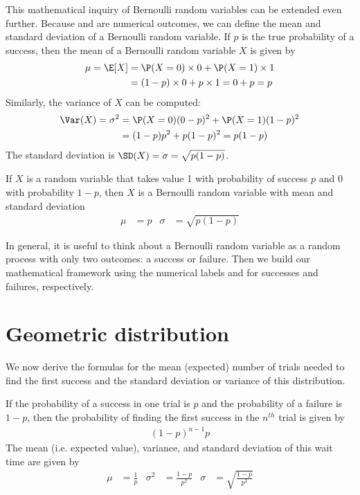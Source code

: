 This mathematical inquiry of Bernoulli random variables can be extended even further. Because  and  are numerical outcomes, we can define the {mean} and {standard deviation} of a Bernoulli random variable. If ${p}$ is the true probability of a success, then the mean of a Bernoulli random variable $X$ is given by
\begin{align*}
\mu = \E[X] &= \P(X=0)\times0 + \P(X=1)\times1 \\
	&= (1-p)\times0 + p\times 1 = 0+p = p
\end{align*}
Similarly, the variance of $X$ can be computed:
\begin{align*}
\Var(X)=\sigma^2 &= {\P(X=0)(0-p)^2 + \P(X=1)(1-p)^2} \\
	&= {(1-p)p^2 + p(1-p)^2} = {p(1-p)}
\end{align*}
The standard deviation is $\SD(X)=\sigma=\sqrt{p(1-p)}$.

\begin{termBox}{
If $X$ is a random variable that takes value 1 with probability of success $p$ and 0 with probability $1-p$, then $X$ is a Bernoulli random variable with mean and standard deviation
\begin{align*}
\mu &= p
	&\sigma&= \sqrt{p(1-p)}
\end{align*}}
\end{termBox}

In general, it is useful to think about a Bernoulli random variable as a random process with only two outcomes: a success or failure. Then we build our mathematical framework using the numerical labels  and  for successes and failures, respectively.


\section{Geometric distribution}\label{geomDist}



We now derive the formulas for the mean (expected) number of trials needed to find the first success and the standard deviation or variance of this distribution.

\begin{termBox}{
If the probability of a success in one trial is $p$ and the probability of a failure is $1-p$, then the probability of finding the first success in the $n^{th}$ trial is given by\vspace{-1.5mm}
\begin{eqnarray}
(1-p)^{n-1}p
\end{eqnarray}
The mean (i.e. expected value), variance, and standard deviation of this wait time are given by\vspace{-2.5mm}
\begin{align}
\mu &= \frac{1}{p}
	&\sigma^2&=\frac{1-p}{p^2}
	&\sigma &= \sqrt{\frac{1-p}{p^2}}
\label{geomFormulas}
\end{align}}
\end{termBox}

